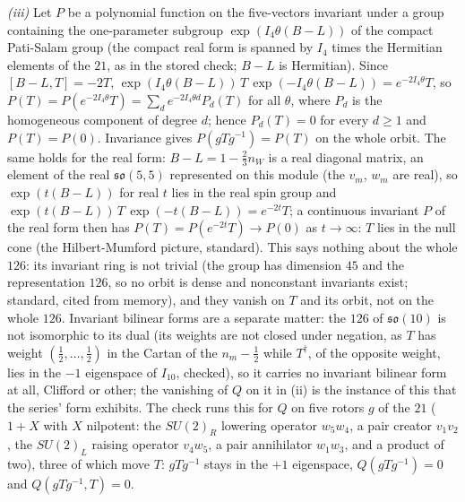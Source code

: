 \emph{(iii)} Let $P$ be a polynomial function on the five-vectors invariant under a group containing the one-parameter subgroup $\exp(I_{4}\theta(B - L))$ of the compact Pati-Salam group (the compact real form is spanned by $I_{4}$ times the Hermitian elements of the $21$, as in the stored check; $B - L$ is Hermitian). Since $[B - L, T] = -2T$, $\exp(I_{4}\theta(B - L))\,T\,\exp(-I_{4}\theta(B - L)) = e^{-2I_{4}\theta}T$, so $P(T) = P(e^{-2I_{4}\theta}T) = \sum_{d}e^{-2I_{4}\theta d}P_{d}(T)$ for all $\theta$, where $P_{d}$ is the homogeneous component of degree $d$; hence $P_{d}(T) = 0$ for every $d \ge 1$ and $P(T) = P(0)$. Invariance gives $P(gTg^{-1}) = P(T)$ on the whole orbit. The same holds for the real form: $B - L = 1 - \tfrac23 n_{W}$ is a real diagonal matrix, an element of the real $\mathfrak{so}(5,5)$ represented on this module (the $v_{m}$, $w_{m}$ are real), so $\exp(t(B - L))$ for real $t$ lies in the real spin group and $\exp(t(B - L))\,T\,\exp(-t(B - L)) = e^{-2t}T$; a continuous invariant $P$ of the real form then has $P(T) = P(e^{-2t}T) \to P(0)$ as $t \to \infty$: $T$ lies in the null cone (the Hilbert-Mumford picture, standard). This says nothing about the whole $126$: its invariant ring is not trivial (the group has dimension $45$ and the representation $126$, so no orbit is dense and nonconstant invariants exist; standard, cited from memory), and they vanish on $T$ and its orbit, not on the whole $126$. Invariant bilinear forms are a separate matter: the $126$ of $\mathfrak{so}(10)$ is not isomorphic to its dual (its weights are not closed under negation, as $T$ has weight $(\tfrac12, \ldots, \tfrac12)$ in the Cartan of the $n_{m} - \tfrac12$ while $T^{\dagger}$, of the opposite weight, lies in the $-1$ eigenspace of $I_{10}$, checked), so it carries no invariant bilinear form at all, Clifford or other; the vanishing of $Q$ on it in (ii) is the instance of this that the series' form exhibits. The check runs this for $Q$ on five rotors $g$ of the $21$ ($1 + X$ with $X$ nilpotent: the $SU(2)_{R}$ lowering operator $w_{5}w_{4}$, a pair creator $v_{1}v_{2}$, the $SU(2)_{L}$ raising operator $v_{4}w_{5}$, a pair annihilator $w_{1}w_{3}$, and a product of two), three of which move $T$: $gTg^{-1}$ stays in the $+1$ eigenspace, $Q(gTg^{-1}) = 0$ and $Q(gTg^{-1}, T) = 0$.

